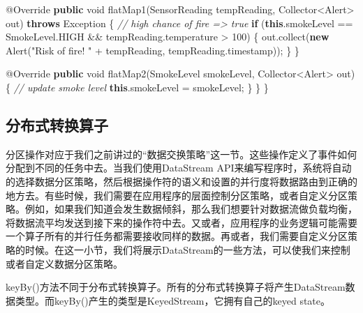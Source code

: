 \documentclass[cn,11pt,chinese]{elegantbook}
\newenvironment{Shaded}{}{}
\newcommand{\AttributeTok}[1]{\textcolor[rgb]{0.49,0.56,0.16}{#1}}
\newcommand{\BuiltInTok}[1]{#1}
\newcommand{\CommentTok}[1]{\textcolor[rgb]{0.38,0.63,0.69}{\textit{#1}}}
\newcommand{\DataTypeTok}[1]{\textcolor[rgb]{0.56,0.13,0.00}{#1}}
\newcommand{\DecValTok}[1]{\textcolor[rgb]{0.25,0.63,0.44}{#1}}
\newcommand{\FunctionTok}[1]{\textcolor[rgb]{0.02,0.16,0.49}{#1}}
\newcommand{\KeywordTok}[1]{\textcolor[rgb]{0.00,0.44,0.13}{\textbf{#1}}}
\newcommand{\NormalTok}[1]{#1}
\newcommand{\StringTok}[1]{\textcolor[rgb]{0.25,0.44,0.63}{#1}}
\renewenvironment{quote}{\begin{customblockquote}\list{}{\rightmargin=0em\leftmargin=0em}%
\item\relax\color{blockquote-text}\ignorespaces}{\unskip\unskip\endlist\end{customblockquote}}
\begin{document}
\begin{Shaded}
\begin{Highlighting}[]
        \AttributeTok{@Override}
        \KeywordTok{public} \DataTypeTok{void} \FunctionTok{flatMap1}\NormalTok{(SensorReading tempReading, Collector\textless{}Alert\textgreater{} out) }\KeywordTok{throws} \BuiltInTok{Exception}\NormalTok{ \{}
            \CommentTok{// high chance of fire =\textgreater{} true}
            \KeywordTok{if}\NormalTok{ (}\KeywordTok{this}\NormalTok{.}\FunctionTok{smokeLevel}\NormalTok{ == SmokeLevel.}\FunctionTok{HIGH}\NormalTok{ \&\& tempReading.}\FunctionTok{temperature}\NormalTok{ \textgreater{} }\DecValTok{100}\NormalTok{) \{}
\NormalTok{                out.}\FunctionTok{collect}\NormalTok{(}\KeywordTok{new} \FunctionTok{Alert}\NormalTok{(}\StringTok{"Risk of fire! "}\NormalTok{ + tempReading, tempReading.}\FunctionTok{timestamp}\NormalTok{));}
\NormalTok{            \}}
\NormalTok{        \}}

        \AttributeTok{@Override}
        \KeywordTok{public} \DataTypeTok{void} \FunctionTok{flatMap2}\NormalTok{(SmokeLevel smokeLevel, Collector\textless{}Alert\textgreater{} out) \{}
            \CommentTok{// update smoke level}
            \KeywordTok{this}\NormalTok{.}\FunctionTok{smokeLevel}\NormalTok{ = smokeLevel;}
\NormalTok{        \}}
\NormalTok{    \}}
\NormalTok{\}}
\end{Highlighting}
\end{Shaded}

\hypertarget{ux5206ux5e03ux5f0fux8f6cux6362ux7b97ux5b50}{%
\subsection{分布式转换算子}\label{ux5206ux5e03ux5f0fux8f6cux6362ux7b97ux5b50}}

分区操作对应于我们之前讲过的``数据交换策略''这一节。这些操作定义了事件如何分配到不同的任务中去。当我们使用DataStream
API来编写程序时，系统将自动的选择数据分区策略，然后根据操作符的语义和设置的并行度将数据路由到正确的地方去。有些时候，我们需要在应用程序的层面控制分区策略，或者自定义分区策略。例如，如果我们知道会发生数据倾斜，那么我们想要针对数据流做负载均衡，将数据流平均发送到接下来的操作符中去。又或者，应用程序的业务逻辑可能需要一个算子所有的并行任务都需要接收同样的数据。再或者，我们需要自定义分区策略的时候。在这一小节，我们将展示DataStream的一些方法，可以使我们来控制或者自定义数据分区策略。

\begin{quote}
keyBy()方法不同于分布式转换算子。所有的分布式转换算子将产生DataStream数据类型。而keyBy()产生的类型是KeyedStream，它拥有自己的keyed
state。
\end{quote}
\end{document}
